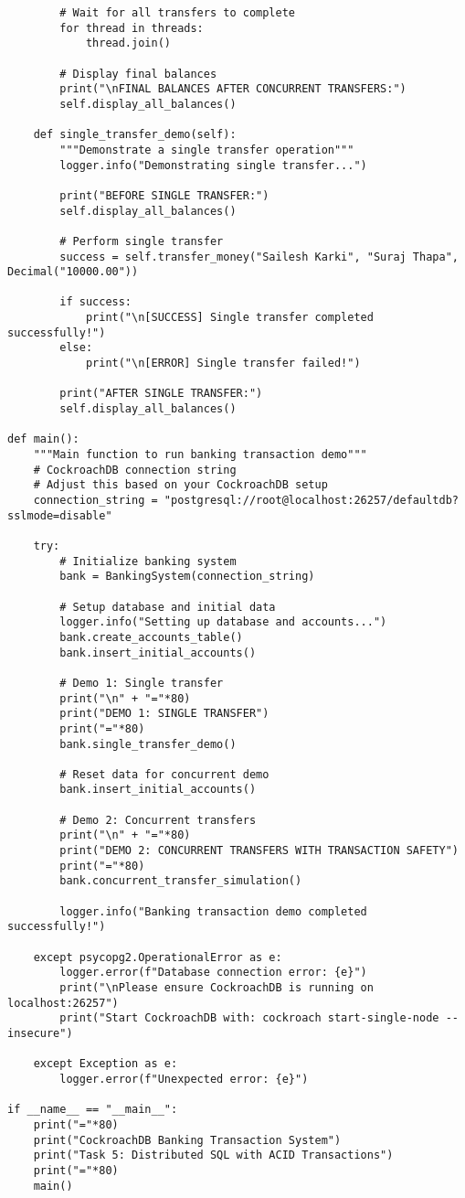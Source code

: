 \begin{verbatim}
        # Wait for all transfers to complete
        for thread in threads:
            thread.join()

        # Display final balances
        print("\nFINAL BALANCES AFTER CONCURRENT TRANSFERS:")
        self.display_all_balances()

    def single_transfer_demo(self):
        """Demonstrate a single transfer operation"""
        logger.info("Demonstrating single transfer...")

        print("BEFORE SINGLE TRANSFER:")
        self.display_all_balances()

        # Perform single transfer
        success = self.transfer_money("Sailesh Karki", "Suraj Thapa", Decimal("10000.00"))

        if success:
            print("\n[SUCCESS] Single transfer completed successfully!")
        else:
            print("\n[ERROR] Single transfer failed!")

        print("AFTER SINGLE TRANSFER:")
        self.display_all_balances()

def main():
    """Main function to run banking transaction demo"""
    # CockroachDB connection string
    # Adjust this based on your CockroachDB setup
    connection_string = "postgresql://root@localhost:26257/defaultdb?sslmode=disable"

    try:
        # Initialize banking system
        bank = BankingSystem(connection_string)

        # Setup database and initial data
        logger.info("Setting up database and accounts...")
        bank.create_accounts_table()
        bank.insert_initial_accounts()

        # Demo 1: Single transfer
        print("\n" + "="*80)
        print("DEMO 1: SINGLE TRANSFER")
        print("="*80)
        bank.single_transfer_demo()

        # Reset data for concurrent demo
        bank.insert_initial_accounts()

        # Demo 2: Concurrent transfers
        print("\n" + "="*80)
        print("DEMO 2: CONCURRENT TRANSFERS WITH TRANSACTION SAFETY")
        print("="*80)
        bank.concurrent_transfer_simulation()

        logger.info("Banking transaction demo completed successfully!")

    except psycopg2.OperationalError as e:
        logger.error(f"Database connection error: {e}")
        print("\nPlease ensure CockroachDB is running on localhost:26257")
        print("Start CockroachDB with: cockroach start-single-node --insecure")

    except Exception as e:
        logger.error(f"Unexpected error: {e}")

if __name__ == "__main__":
    print("="*80)
    print("CockroachDB Banking Transaction System")
    print("Task 5: Distributed SQL with ACID Transactions")
    print("="*80)
    main()
\end{verbatim}


